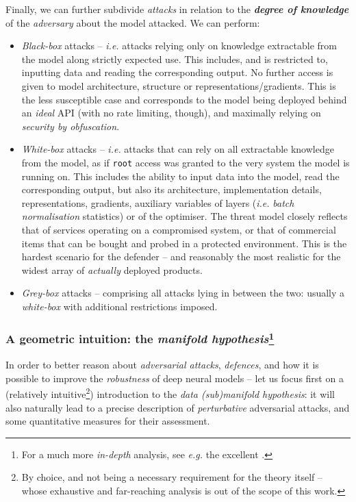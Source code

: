 Finally, we can further subdivide \textit{attacks} in relation to the \textit{\textbf{degree of knowledge}} of the \textit{adversary} about the model attacked. We can perform:
\begin{itemize}
    \item \textit{Black-box} attacks -- \textit{i.e.} attacks relying only on knowledge extractable from the model along strictly expected use. This includes, and is restricted to, inputting data and reading the corresponding output. No further access is given to model architecture, structure or representations/gradients. This is the less susceptible case and corresponds to the model being deployed behind an \textit{ideal} API (with no rate limiting, though), and maximally relying on \textit{security by obfuscation}.
    \item \textit{White-box} attacks -- \textit{i.e.} attacks that can rely on all extractable knowledge from the model, as if \texttt{root} access was granted to the very system the model is running on. This includes the ability to input data into the model, read the corresponding output, but also its architecture, implementation details, representations, gradients, auxiliary variables of layers (\textit{i.e.} \textit{batch normalisation} statistics) or of the optimiser. The threat model closely reflects that of services operating on a compromised system, or that of commercial items that can be bought and probed in a protected environment. This is the hardest scenario for the defender -- and reasonably the most realistic for the widest array of \textit{actually} deployed products.
    \item \textit{Grey-box} attacks -- comprising all attacks lying in between the two: usually a \textit{white-box} with additional restrictions imposed.
\end{itemize}

\subsubsection[{A geometric intuition: the \textit{manifold hypothesis}}]{{A geometric intuition: the \textit{manifold hypothesis}}\protect\footnote{For a much more \textit{in-depth} analysis, see \textit{e.g.} the excellent \cite{Dube2018HighDS}.}}

In order to better reason about \textit{adversarial attacks}, \textit{defences}, and how it is possible to improve the \textit{robustness} of deep neural models -- let us focus first on a (relatively intuitive\footnote{By choice, and not being a necessary requirement for the theory itself -- whose exhaustive and far-reaching analysis is out of the scope of this work.}) introduction to the \textit{data (sub)manifold hypothesis}: it will also naturally lead to a precise description of \textit{perturbative} adversarial attacks, and some quantitative measures for their assessment.

